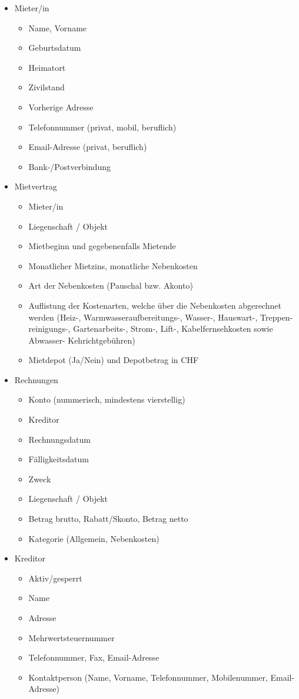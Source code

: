 \begin{itemize}
    \item Mieter/in
    \begin{itemize}
        \item Name, Vorname 
        \item Geburtsdatum
        \item Heimatort 
        \item Zivilstand
        \item Vorherige Adresse
        \item Telefonnummer (privat, mobil, beruflich)
        \item Email-Adresse (privat, beruflich)
        \item Bank-/Postverbindung
    \end{itemize}
    \item Mietvertrag
    \begin{itemize}
        \item Mieter/in
        \item Liegenschaft / Objekt
        \item Mietbeginn und gegebenenfalls Mietende
        \item Monatlicher Mietzins, monatliche Nebenkosten
        \item Art der Nebenkosten (Pauschal bzw. Akonto)
        \item Auflistung der Kostenarten, welche über die Nebenkosten abgerechnet werden (Heiz-, Warmwasseraufbereitungs-, Wasser-, Hauswart-, Treppen-reinigungs-, Gartenarbeits-, Strom-, Lift-, Kabelfernsehkosten sowie Abwasser- Kehrichtgebühren)
        \item Mietdepot (Ja/Nein) und Depotbetrag in CHF
    \end{itemize}
    \newpage
    \item Rechnungen
    \begin{itemize}
        \item Konto (nummerisch, mindestens vierstellig)
        \item Kreditor
        \item Rechnungsdatum
        \item Fälligkeitsdatum
        \item Zweck
        \item Liegenschaft / Objekt
        \item Betrag brutto, Rabatt/Skonto, Betrag netto
        \item Kategorie (Allgemein, Nebenkosten)
    \end{itemize}
    \item Kreditor
    \begin{itemize}
        \item Aktiv/gesperrt
        \item Name
        \item Adresse
        \item Mehrwertsteuernummer
        \item Telefonnummer, Fax, Email-Adresse
        \item Kontaktperson (Name, Vorname, Telefonnummer, Mobilenummer, Email-Adresse)
    \end{itemize}
\end{itemize}